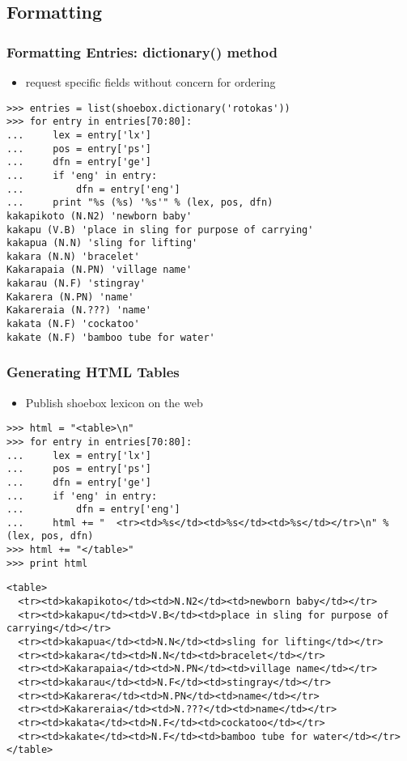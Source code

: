 \documentclass[handout]{beamer}
\begin{document}
\subsection{Formatting}

\begin{frame}[fragile]
\frametitle{Formatting Entries: dictionary() method}

\begin{itemize}
\item request specific fields without concern for ordering
\end{itemize}
\scriptsize

\begin{verbatim}
>>> entries = list(shoebox.dictionary('rotokas'))
>>> for entry in entries[70:80]:
...     lex = entry['lx']
...     pos = entry['ps']
...     dfn = entry['ge']
...     if 'eng' in entry:
...         dfn = entry['eng']
...     print "%s (%s) '%s'" % (lex, pos, dfn)
kakapikoto (N.N2) 'newborn baby'
kakapu (V.B) 'place in sling for purpose of carrying'
kakapua (N.N) 'sling for lifting'
kakara (N.N) 'bracelet'
Kakarapaia (N.PN) 'village name'
kakarau (N.F) 'stingray'
Kakarera (N.PN) 'name'
Kakareraia (N.???) 'name'
kakata (N.F) 'cockatoo'
kakate (N.F) 'bamboo tube for water'
\end{verbatim}
\end{frame}

\begin{frame}[fragile]
\frametitle{Generating HTML Tables}

\begin{itemize}
\item Publish shoebox lexicon on the web
\end{itemize}
\scriptsize

\begin{verbatim}
>>> html = "<table>\n"
>>> for entry in entries[70:80]:
...     lex = entry['lx']
...     pos = entry['ps']
...     dfn = entry['ge']
...     if 'eng' in entry:
...         dfn = entry['eng']
...     html += "  <tr><td>%s</td><td>%s</td><td>%s</td></tr>\n" % (lex, pos, dfn)
>>> html += "</table>"
>>> print html
\end{verbatim}

\tiny

\begin{verbatim}
<table>
  <tr><td>kakapikoto</td><td>N.N2</td><td>newborn baby</td></tr>
  <tr><td>kakapu</td><td>V.B</td><td>place in sling for purpose of carrying</td></tr>
  <tr><td>kakapua</td><td>N.N</td><td>sling for lifting</td></tr>
  <tr><td>kakara</td><td>N.N</td><td>bracelet</td></tr>
  <tr><td>Kakarapaia</td><td>N.PN</td><td>village name</td></tr>
  <tr><td>kakarau</td><td>N.F</td><td>stingray</td></tr>
  <tr><td>Kakarera</td><td>N.PN</td><td>name</td></tr>
  <tr><td>Kakareraia</td><td>N.???</td><td>name</td></tr>
  <tr><td>kakata</td><td>N.F</td><td>cockatoo</td></tr>
  <tr><td>kakate</td><td>N.F</td><td>bamboo tube for water</td></tr>
</table>
\end{verbatim}
\end{frame}
\end{document}
